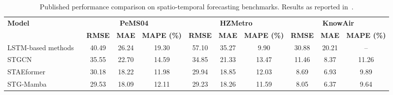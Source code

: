 \documentclass[acmsmall]{acmart}
\begin{document}
\begin{table}[h]
\centering
\caption{
Published performance comparison on spatio-temporal forecasting benchmarks.
Results as reported in~\cite{li2024stg}.
}
\label{tab:TRperformance_comparison}
\scriptsize
\begin{tabular}{lccccccccc}
\toprule
\multirow{2}{*}{\textbf{Model}} &
\multicolumn{3}{c}{\textbf{PeMS04}} &
\multicolumn{3}{c}{\textbf{HZMetro}} &
\multicolumn{3}{c}{\textbf{KnowAir}} \\
\cmidrule(lr){2-4}
\cmidrule(lr){5-7}
\cmidrule(lr){8-10}
&
\textbf{RMSE} & \textbf{MAE} & \textbf{MAPE (\%)} &
\textbf{RMSE} & \textbf{MAE} & \textbf{MAPE (\%)} &
\textbf{RMSE} & \textbf{MAE} & \textbf{MAPE (\%)} \\
\midrule

LSTM-based methods
~\cite{sutskever2014sequence,liu2020physical,tian2024air}
& 40.49 & 26.24 & 19.30
& 57.10 & 35.27 & 9.90
& 30.88 & 20.21 & -- \\

STGCN~\cite{yu2017stgcn}
& 35.55 & 22.70 & 14.59
& 34.85 & 21.33 & 13.47
& 11.46 & 8.37 & 11.26 \\

STAEformer~\cite{liu2023spatio}
& 30.18 & 18.22 & 11.98
& 29.94 & 18.85 & 12.03
& 8.69 & 6.93 & 9.89 \\

\rowcolor{lightgray}
STG-Mamba~\cite{li2024stg}
& 29.53 & 18.09 & 12.11
& 29.23 & 18.26 & 11.59
& 8.05 & 6.37 & 9.64 \\

\bottomrule
\end{tabular}
\end{table}
\end{document}
